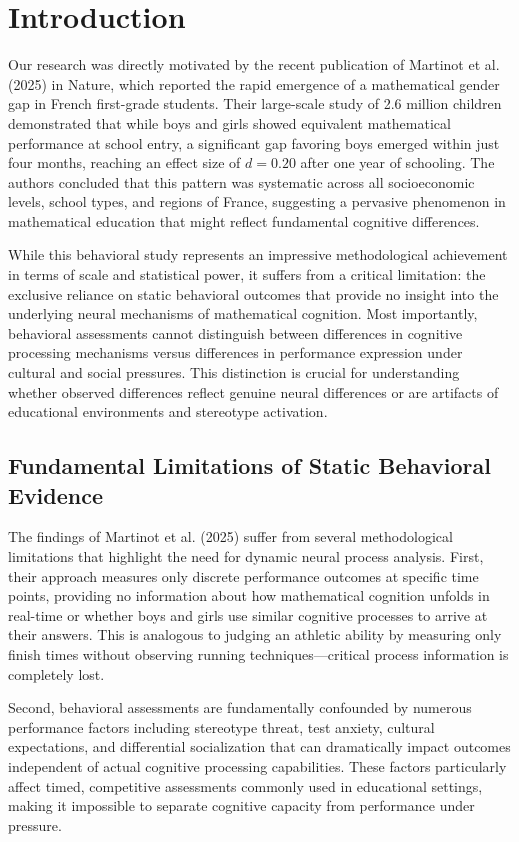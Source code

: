 \documentclass[pdflatex,sn-nature]{sn-jnl}%
\theoremstyle{thmstyleone}%
\theoremstyle{thmstyletwo}%
\theoremstyle{thmstylethree}%
\begin{document}
\section{Introduction}\label{sec1}
Our research was directly motivated by the recent publication of Martinot et al. (2025)\cite{martinot2025mathematical} in Nature, which reported the rapid emergence of a mathematical gender gap in French first-grade students. Their large-scale study of 2.6 million children demonstrated that while boys and girls showed equivalent mathematical performance at school entry, a significant gap favoring boys emerged within just four months, reaching an effect size of $d = 0.20$ after one year of schooling. The authors concluded that this pattern was systematic across all socioeconomic levels, school types, and regions of France, suggesting a pervasive phenomenon in mathematical education that might reflect fundamental cognitive differences.

While this behavioral study represents an impressive methodological achievement in terms of scale and statistical power, it suffers from a critical limitation: the exclusive reliance on static behavioral outcomes that provide no insight into the underlying neural mechanisms of mathematical cognition. Most importantly, behavioral assessments cannot distinguish between differences in cognitive processing mechanisms versus differences in performance expression under cultural and social pressures. This distinction is crucial for understanding whether observed differences reflect genuine neural differences or are artifacts of educational environments and stereotype activation.

\subsection{Fundamental Limitations of Static Behavioral Evidence}
The findings of Martinot et al. (2025)\cite{martinot2025mathematical} suffer from several methodological limitations that highlight the need for dynamic neural process analysis. First, their approach measures only discrete performance outcomes at specific time points, providing no information about how mathematical cognition unfolds in real-time or whether boys and girls use similar cognitive processes to arrive at their answers. This is analogous to judging an athletic ability by measuring only finish times without observing running techniques—critical process information is completely lost.

Second, behavioral assessments are fundamentally confounded by numerous performance factors including stereotype threat, test anxiety, cultural expectations, and differential socialization that can dramatically impact outcomes independent of actual cognitive processing capabilities\cite{spencer1999stereotype,schmader2008threat}. These factors particularly affect timed, competitive assessments commonly used in educational settings, making it impossible to separate cognitive capacity from performance under pressure.
\end{document}
